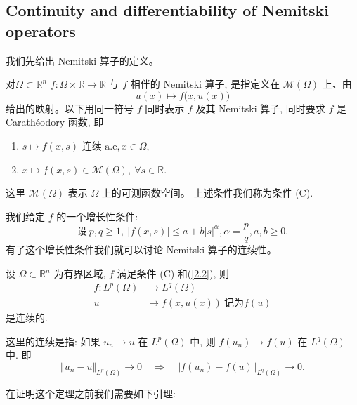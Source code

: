 \documentclass[11pt]{ctexart}
\begin{document}
\subsection{Continuity and differentiability of Nemitski operators}
我们先给出 Nemitski 算子的定义。
\begin{definition}
  对$\Omega \subset \mathbb{R}^n$ $f: \Omega \times \mathbb{R} \to \mathbb{R}$ 与 $f$ 相伴的 Nemitski 算子, 是指定义在 $\mathcal{M}(\Omega)$ 上、由
  \begin{equation*}
    u(x) \mapsto f\bigl(x, u(x)\bigr)
  \end{equation*}
  给出的映射。以下用同一符号 $f$ 同时表示 $f$ 及其 Nemitski 算子, 同时要求 $f$ 是 Carathéodory 函数, 即
  \begin{enumerate}
    \item $s \mapsto f(x,s)$ 连续 $\mathrm{a.e}, x\in \Omega$,
    \item $x \mapsto f(x,s) \in \mathcal{M}(\Omega),\ \forall s \in \mathbb{R}$.
  \end{enumerate}
  这里 $\mathcal{M}(\Omega)$ 表示 $\Omega$ 上的可测函数空间。 上述条件我们称为条件 (C).
\end{definition}
我们给定 $f$ 的一个增长性条件:
\begin{equation}\label{2.2}
  \text{设}\  p,q \geq 1,\ |f(x,s)| \leq a + b|s|^{\alpha}, \alpha = \frac{p}{q}, a,b \geq 0.
\end{equation}
有了这个增长性条件我们就可以讨论 Nemitski 算子的连续性。
\begin{theorem}\label{thm:continuity}
  设 $\Omega \subset \mathbb{R}^{n}$ 为有界区域, $f$ 满足条件 (C) 和(\ref{2.2}), 则
  \begin{equation*}
    \begin{aligned}
      f : L^{p}(\Omega) &\to L^{q}(\Omega)\\
      u &\mapsto f(x, u(x))\ \text{记为} f(u)
    \end{aligned}
  \end{equation*}
  是连续的.
\end{theorem}
\begin{remark}
  这里的连续是指: 如果 $u_{n} \to u$ 在 $L^{p}(\Omega)$ 中, 则 $f(u_{n}) \to f(u)$ 在 $L^{q}(\Omega)$ 中. 即
  \begin{equation*}
    \Vert u_{n} - u \Vert_{L^{p}(\Omega)} \to 0 \quad \Longrightarrow \quad \Vert f(u_{n}) - f(u) \Vert_{L^{q}(\Omega)} \to 0.
  \end{equation*}
\end{remark}
在证明这个定理之前我们需要如下引理:
\end{document}
